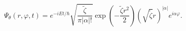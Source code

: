 \begin{equation}
\Psi_{\theta}\left(  r,\varphi,t\right)  =e^{-iEt/\hbar}\sqrt{\frac
{\tilde{\zeta}}{\pi\left|  \alpha\right|  !}}\exp\left(  -\frac{\tilde{\zeta
}r^{2}}{2}\right)  \left(  \sqrt{\tilde{\zeta}}r\right)  ^{\left|
\alpha\right|  }e^{i\alpha\varphi}.\label{50}%
\end{equation}

